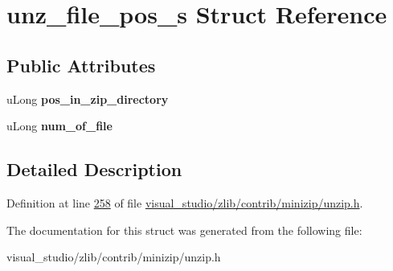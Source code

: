 \hypertarget{structunz__file__pos__s}{}\section{unz\+\_\+file\+\_\+pos\+\_\+s Struct Reference}
\label{structunz__file__pos__s}
\subsection*{Public Attributes}
\begin{DoxyCompactItemize}
\item 
\mbox{\label{structunz__file__pos__s_a87d193346d3825363f899f574a2f3cb2}} 
u\+Long {\bfseries pos\+\_\+in\+\_\+zip\+\_\+directory}
\item 
\mbox{\label{structunz__file__pos__s_a771dc0b7dba811b6174382f87f6800fc}} 
u\+Long {\bfseries num\+\_\+of\+\_\+file}
\end{DoxyCompactItemize}


\subsection{Detailed Description}


Definition at line \hyperlink{visual__studio_2zlib_2contrib_2minizip_2unzip_8h_source_l00258}{258} of file \hyperlink{visual__studio_2zlib_2contrib_2minizip_2unzip_8h_source}{visual\+\_\+studio/zlib/contrib/minizip/unzip.\+h}.



The documentation for this struct was generated from the following file\+:\begin{DoxyCompactItemize}
\item 
visual\+\_\+studio/zlib/contrib/minizip/unzip.\+h\end{DoxyCompactItemize}
